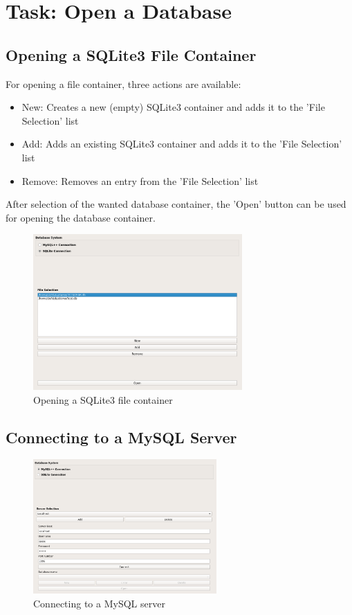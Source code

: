 \section{Task: Open a Database}
\label{sec:task_open_database}

\subsection{Opening a SQLite3 File Container}
\label{sec:sqlite_open}
For opening a file container, three actions are available:

\begin{itemize}  
\item New: Creates a new (empty) SQLite3 container and adds it to the 'File Selection' list
\item Add: Adds an existing  SQLite3 container and adds it to the 'File Selection' list
\item Remove: Removes an entry from the 'File Selection' list
\end{itemize}

After selection of the wanted database container, the 'Open' button can be used for opening the database container.

\begin{figure}[H]
  \center
    \includegraphics[width=8cm,frame]{../screenshots/sqlite3_open.png}
  \caption{Opening a SQLite3 file container}
  \label{fig:sqlite3_open}
\end{figure} 


\subsection{Connecting to a MySQL Server}
\label{sec:mysql_connect}

\begin{figure}[H]
  \center
    \includegraphics[width=7cm,frame]{../screenshots/mysql_server_selection.png}
  \caption{Connecting to a MySQL server}
  \label{fig:mysql_connect}
\end{figure}

